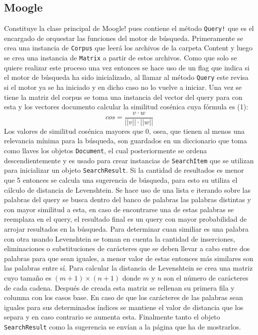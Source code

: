 \documentclass[a4paper,12pt]{article}
\begin{document}
\subsection{Moogle}
    Constituye la clase principal de Moogle! pues contiene el método \texttt{Query!} que es el encargado de orquestar
las funciones del motor de búsqueda. Primeramente se crea una instancia de \texttt{Corpus} que leerá los archivos de la carpeta
Content y luego se crea una instancia de \texttt{Matrix} a partir de estos archivos. Como que solo se quiere realizar este proceso
una vez entonces se hace uso de un flag que indica si el motor de búsqueda ha sido inicializado, al llamar al método \texttt{Query}
este revisa si el motor ya se ha iniciado y en dicho caso no lo vuelve a iniciar. Una vez se tiene la matriz del corpus se toma una
instancia del vector del query para con esta y los vectores documento calcular la similitud cosénica cuya fórmula es (1):
\begin{equation}
    cos = \frac{v \cdot w}{||v|| \cdot ||w||}
\end{equation}\newline
Los valores de similitud cosénica mayores que 0, osea, que tienen al menos una relevancia mínima para la búsqueda, son guardados en un
diccionario que toma como llaves los objetos \texttt{Document}, el cual posteriormente se ordena descendientemente y es usado para crear
instancias de \texttt{SearchItem} que se utilizan para inicializar un objeto \texttt{SearchResult}. Si la cantidad de resultados es menor
que 5 entonces se calcula una sugerencia de búsqueda, para esto su utiliza el cálculo de distancia de Levenshtein. Se hace uso de una lista e
iterando sobre las palabras del query se busca dentro del banco de palabras las palabras distintas y con mayor similitud a esta, en caso de encontrarse
una de estas palabras se reemplaza en el query, el resultado final es un query con mayor probabilidad de arrojar resultados en la búsqueda. Para determinar
cuan similiar es una palabra con otra usando Levenshtein se toman en cuenta la cantidad de inserciones, eliminaciones o substituciones de carácteres que
se deben llevar a cabo entre dos palabras para que sean iguales, a menor valor de estas entonces más similares son las palabras entre sí. Para calcular
la distancia de Levenshtein se crea una matriz cuyo tamaño es $(m + 1)\times (n + 1)$ donde $m$ y $n$ son el número de carácteres de cada cadena. Después
de creada esta matriz se rellenan su primera fila y columna con los casos base. En caso de que los carácteres de las palabras sean iguales para sus determinados índices se mantiene el valor de distancia que los separa y en caso contrario se aumenta esta. Finalmente tanto el objeto \texttt{SearchResult}
como la sugerencia se envían a la página que ha de mostrarlos.
\end{document}
